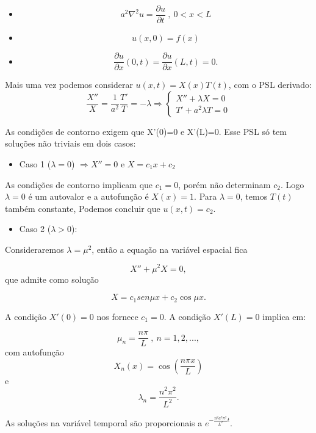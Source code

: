 \documentclass[a4paper,portuguese,9pt,final]{extarticle}
\providecommand{\sin}{} \renewcommand{\sin}{sen}
\begin{document}
\begin{multicols*}{2}
        \begin{itemize}
            \item[] $$ a^{2}\nabla^{2}u =  \frac{\partial u}{\partial t} \ , \ 0<x<L$$
            \item[] $$ u(x,0)=f(x)$$
            \item[] $$ \frac{\partial u}{\partial x} (0,t) = \frac{\partial u}{\partial x} (L,t) =0.$$
        \end{itemize}

        Mais uma vez podemos considerar $ u(x,t)=X(x)T(t) $, com o PSL derivado:
        $$ \frac{X''}{X} = \frac{1}{a^{2}} \frac{T'}{T} = -\lambda \Rightarrow \begin{cases}
        X''+\lambda X = 0 \\ 
        T'+a^{2}\lambda T=0
        \end{cases}$$

        As condições de contorno exigem que X'(0)=0 e X'(L)=0. Esse PSL só tem soluções não triviais em dois casos:

        \begin{itemize}
            \item Caso 1 ($\lambda = 0$) $\Rightarrow X''=0$ e $ X=c_{1}x+c_{2}$
        \end{itemize}

        As condições de contorno implicam que $ c_{1}=0 $, porém não determinam $ c_{2} $. Logo $ \lambda=0 $ é um autovalor e a autofunção é $ X(x)=1 $. Para $ \lambda=0 $, temos $ T(t) $ também constante, Podemos concluir que $ u(x,t)=c_{2} $.

        \begin{itemize}
            \item Caso 2 ($\lambda >0 $):
        \end{itemize}

        Consideraremos $ \lambda = \mu^{2} $, então a equação na variável espacial fica 

        $$X''+\mu^{2}X=0,$$   que admite como solução

        $$ X=c_{1}\sin\mu x + c_{2} \cos\mu x. $$

        A condição $ X'(0)=0 $ nos fornece $c_{1}=0$. A condição $X'(L)=0$ implica em:


        $$\mu_{n}=\frac{n\pi}{L} \ , \ n=1,2,..., $$ com autofunção  $$ X_{n}(x) = \cos \left(\frac{n\pi x}{L}\right) $$ e 
        $$ \lambda_{n} = \frac{n^{2}\pi^{2}}{L^{2}}.$$

        As soluções na variável temporal são proporcionais a $ e^{-\frac{n^{2}a^{2}\pi^{2}}{L^{2}}t}  $. \\


\end{multicols*}
\end{document}
